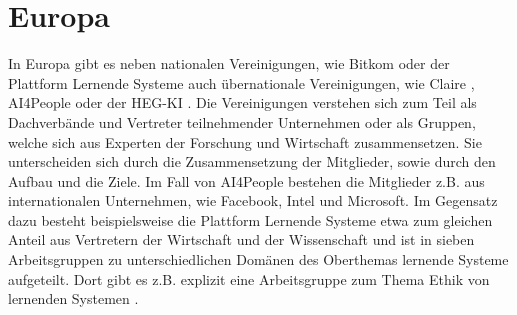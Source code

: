 \section{Europa}\label{sec:europa}
In Europa gibt es neben nationalen Vereinigungen, wie Bitkom \cite{bitkom} oder der Plattform Lernende Systeme \cite{pls} auch übernationale Vereinigungen, wie Claire \cite{claire}, AI4People \cite{ai4people} oder der HEG-KI \cite{smuha}.
Die Vereinigungen verstehen sich zum Teil als Dachverbände und Vertreter teilnehmender Unternehmen oder als Gruppen, welche sich aus Experten der Forschung und Wirtschaft zusammensetzen.
Sie unterscheiden sich durch die Zusammensetzung der Mitglieder, sowie durch den Aufbau und die Ziele.
Im Fall von AI4People bestehen die Mitglieder z.B. aus internationalen Unternehmen, wie Facebook, Intel und Microsoft.
Im Gegensatz dazu besteht beispielsweise die Plattform Lernende Systeme etwa zum gleichen Anteil aus Vertretern der Wirtschaft und der Wissenschaft und ist in sieben Arbeitsgruppen zu unterschiedlichen Domänen des Oberthemas lernende Systeme aufgeteilt.
Dort gibt es z.B. explizit eine Arbeitsgruppe zum Thema Ethik von lernenden Systemen \cite{plsa}.

